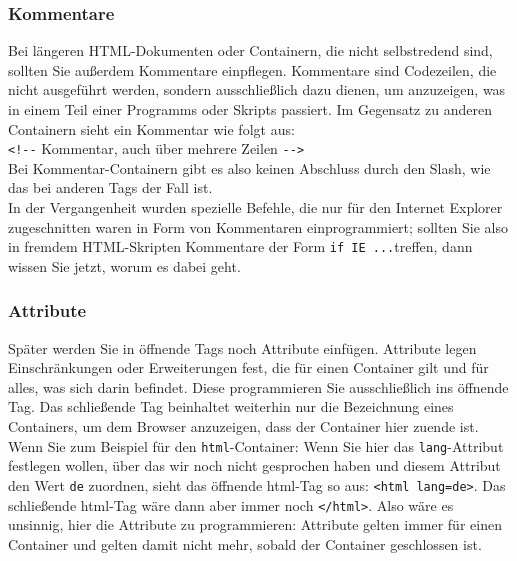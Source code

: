 \subsubsection{Kommentare}

Bei längeren HTML-Dokumenten oder Containern, die nicht selbstredend sind, sollten Sie außerdem Kommentare einpflegen. Kommentare sind Codezeilen, die nicht ausgeführt werden, sondern ausschließlich dazu dienen, um anzuzeigen, was in einem Teil einer Programms oder Skripts passiert. Im Gegensatz zu anderen Containern sieht ein Kommentar wie folgt aus:\\

\verb|<!--| Kommentar, auch über mehrere Zeilen \verb|-->|\\

Bei Kommentar-Containern gibt es also keinen Abschluss durch den Slash, wie das bei anderen Tags der Fall ist.\\

In der Vergangenheit wurden spezielle Befehle, die nur für den Internet Explorer zugeschnitten waren in Form von Kommentaren einprogrammiert; sollten Sie also in fremdem HTML-Skripten Kommentare der Form \verb|if IE ...|treffen, dann wissen Sie jetzt, worum es dabei geht.

\subsubsection{Attribute}

Später werden Sie in öffnende Tags noch Attribute einfügen. Attribute legen Einschränkungen oder Erweiterungen fest, die für einen Container gilt und für alles, was sich darin befindet. Diese programmieren Sie ausschließlich ins öffnende Tag. Das schließende Tag beinhaltet weiterhin nur die Bezeichnung eines Containers, um dem Browser anzuzeigen, dass der Container hier \glqq{}zuende\grqq{} ist.\\

Wenn Sie zum Beispiel für den \verb|html|-Container: Wenn Sie hier das \verb|lang|-Attribut festlegen wollen, über das wir noch nicht gesprochen haben und diesem Attribut den Wert \verb|de| zuordnen, sieht das öffnende html-Tag so aus: \verb|<html lang=de>|. Das schließende html-Tag wäre dann aber immer noch \verb|</html>|. Also wäre es unsinnig, hier die Attribute zu programmieren: Attribute gelten immer für einen Container und gelten damit nicht mehr, sobald der Container geschlossen ist.\\

